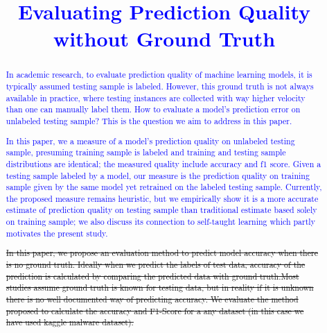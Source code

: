 \documentclass[a4paper,conference]{IEEEtran}
\begin{document}
\title{\textcolor{blue}{Evaluating Prediction Quality 
without Ground Truth}}

\author{
\and
{}
}

\maketitle

\begin{abstract}
\textcolor{blue}{
In academic research, to evaluate prediction quality of 
machine learning models, it is typically assumed testing 
sample is labeled. However, this ground truth is not always 
available in practice, where testing instances are collected 
with way higher velocity than one can manually label them. 
How to evaluate a model's prediction error on unlabeled 
testing sample? This is the question we aim to address in this paper. 
}

\textcolor{blue}{
In this paper, we a measure of a model's prediction quality on 
unlabeled testing sample, presuming training
sample is labeled and training and testing sample distributions are 
identical; the measured quality include accuracy and f1 score. 
Given a testing sample labeled by a model, our measure is the 
prediction quality on training sample given by the same model 
yet retrained on the labeled testing sample. 
Currently, the proposed measure remains heuristic, but we empirically 
show it is a more accurate estimate of prediction quality on testing 
sample than traditional estimate based solely on training sample; 
we also discuss its 
connection to self-taught learning which partly motivates 
the present study. 
}

\sout{
In this paper, we propose an evaluation method to predict model accuracy when there is no ground truth. Ideally when we predict the labels of test data, accuracy of the prediction is calculated by comparing the predicted data with ground truth.Most studies assume ground truth is known for testing data, but in reality if it is unknown there is no well documented way of predicting accuracy. We evaluate the method proposed to calculate the accuracy and F1-Score for a any dataset (in this case we have used kaggle malware dataset). }
\end{abstract}
\end{document}
